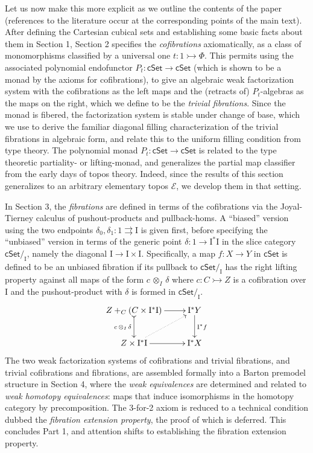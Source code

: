 \documentclass[11pt,reqno]{amsart}
\newcommand{\EE}{\ensuremath{\mathcal{E}}}
\newcommand{\cSet}{\ensuremath{\mathsf{cSet}}}
\newcommand{\mono}{\ensuremath{\rightarrowtail}}
\newcommand{\cof}{\ensuremath{\rightarrowtail}}
\renewcommand{\to}{\ensuremath{\rightarrow}}
\newcommand{\I}{\ensuremath{\mathrm{I}}}
\theoremstyle{remark}
\theoremstyle{definition}
\begin{document}
Let us now make this more explicit as we outline the contents of the paper (references to the literature occur at the corresponding points of the main text).
After defining the Cartesian cubical sets and establishing some basic facts about them in Section 1, Section 2  specifies the \emph{cofibrations} axiomatically, as a class of monomorphisms classified by a universal one $t:1 \cof \Phi$.  This permits using the associated polynomial endofunctor $P_t : \cSet\to \cSet$ (which is shown to be a monad by the axioms for cofibrations), to give an algebraic weak factorization system with the cofibrations as the left maps and the (retracts of) $P_t$-algebras as the maps on the right, which we define to be the \emph{trivial fibrations}.  Since the monad is fibered, the factorization system is stable under change of base, which we use to derive the familiar diagonal filling characterization of the trivial fibrations in algebraic form, and relate this to the uniform filling condition from type theory.  The polynomial monad $P_t : \cSet\to \cSet$ is related to the type theoretic partiality- or lifting-monad, and generalizes the partial map classifier from the early days of topos theory.  Indeed, since the results of this section generalizes to an arbitrary elementary topos \EE, we develop them in that setting. 

In Section 3, the \emph{fibrations} are defined in terms of the cofibrations via the Joyal-Tierney calculus of pushout-products and pullback-homs.  A ``biased'' version using the two endpoints $\delta_0, \delta_1: 1\rightrightarrows\I$ is given first, before specifying the ``unbiased''  version in terms of the generic point $\delta : 1 \to \I^*\I$  in the slice category $\cSet/_\I$, namely the diagonal $\I \to \I\times\I$.  Specifically, a map $f : X \to Y$ in $\cSet$ is defined to be an unbiased fibration if its pullback to $\cSet/_\I$ has the right lifting property against all maps of the form $c\, \otimes_I\, \delta$ where $c : C\mono Z$ is a cofibration over $\I$ and the pushout-product with $\delta$ is formed in $\cSet/_\I$. 
\begin{equation*}\label{diagram:unbiasedfibrationIntro}
\xymatrix{
Z +_C (C\times\I^*\I) \ar@{>->}[d]_{c\, \otimes_I\, \delta} \ar[r] & \I^*Y \ar[d]^{\I^*f} \\
Z\times \I^*\I \ar@{.>}[ru] \ar[r] & \I^*X
}
\end{equation*}
%
The two weak factorization systems of cofibrations and trivial fibrations, and trivial cofibrations and fibrations, are assembled formally into a Barton premodel structure in Section 4, where the \emph{weak equivalences} are determined and related to \emph{weak homotopy equivalences}:  maps that induce isomorphisms in the homotopy category by precomposition.  The 3-for-2 axiom is reduced to a technical condition dubbed the \emph{fibration extension property}, the proof of which is deferred.  This concludes Part 1, and attention shifts to establishing the fibration extension property.
\end{document}
